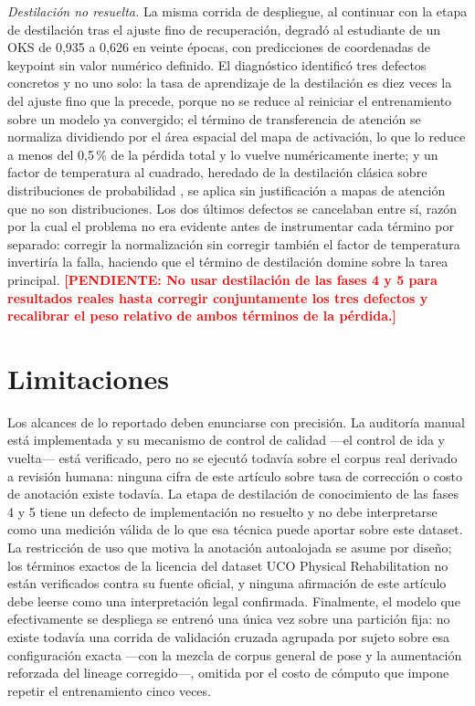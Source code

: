 \documentclass[10pt,a4paper,twocolumn]{article}
\newcommand{\pendiente}[1]{\textcolor{red}{\textbf{[PENDIENTE: #1]}}}
\begin{document}
\emph{Destilación no resuelta.} La misma corrida de despliegue, al continuar
con la etapa de destilación tras el ajuste fino de recuperación, degradó al
estudiante de un OKS de 0,935 a 0,626 en veinte épocas, con predicciones de
coordenadas de keypoint sin valor numérico definido. El diagnóstico
identificó tres defectos concretos y no uno solo: la tasa de aprendizaje de
la destilación es diez veces la del ajuste fino que la precede, porque no se
reduce al reiniciar el entrenamiento sobre un modelo ya convergido; el
término de transferencia de atención se normaliza dividiendo por el área
espacial del mapa de activación, lo que lo reduce a menos del 0,5\,\% de la
pérdida total y lo vuelve numéricamente inerte; y un factor de temperatura al
cuadrado, heredado de la destilación clásica sobre distribuciones de
probabilidad \cite{hinton2015}, se aplica sin justificación a mapas de
atención que no son distribuciones. Los dos últimos defectos se cancelaban
entre sí, razón por la cual el problema no era evidente antes de instrumentar
cada término por separado: corregir la normalización sin corregir también el
factor de temperatura invertiría la falla, haciendo que el término de
destilación domine sobre la tarea principal. \pendiente{No usar destilación
de las fases 4 y 5 para resultados reales hasta corregir conjuntamente los
tres defectos y recalibrar el peso relativo de ambos términos de la
pérdida.}

\section{Limitaciones}
Los alcances de lo reportado deben enunciarse con precisión. La auditoría
manual está implementada y su mecanismo de control de calidad —el control de
ida y vuelta— está verificado, pero no se ejecutó todavía sobre el corpus
real derivado a revisión humana: ninguna cifra de este artículo sobre tasa de
corrección o costo de anotación existe todavía. La etapa de destilación de
conocimiento de las fases 4 y 5 tiene un defecto de implementación no
resuelto y no debe interpretarse como una medición válida de lo que esa
técnica puede aportar sobre este dataset. La restricción de uso que motiva la
anotación autoalojada se asume por diseño; los términos exactos de la
licencia del dataset UCO Physical Rehabilitation no están verificados contra
su fuente oficial, y ninguna afirmación de este artículo debe leerse como una
interpretación legal confirmada. Finalmente, el modelo que efectivamente se
despliega se entrenó una única vez sobre una partición fija: no existe
todavía una corrida de validación cruzada agrupada por sujeto sobre esa
configuración exacta —con la mezcla de corpus general de pose y la
aumentación reforzada del lineage corregido—, omitida por el costo de
cómputo que impone repetir el entrenamiento cinco veces.
\end{document}
